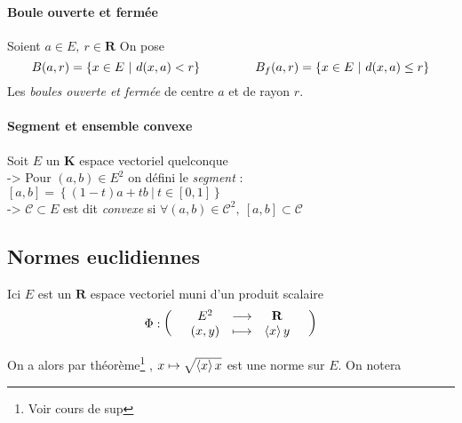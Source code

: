 			
		\traitd
		\paragraph{Boule ouverte et fermée} Soient $a\in E,~r\in\mathbf{R}$ On pose
			\[B(a,r) = \left\{ x\in E ~|~ d(x,a)<r\right\} \hspace*{1.5cm} B_f (a,r) = \left\{ x\in E ~|~ d(x,a) \leq r\right\}\]
			\hspace*{0.6cm} Les \emph{boules ouverte et fermée} de centre $a$ et de rayon $r$. 
		\traitdouble
		\paragraph{Segment et ensemble convexe} Soit $E$ un $\mathbf{K}$ espace vectoriel quelconque \vspace*{0.2cm}\\
			\hspace*{0.5cm} -> Pour $(a,b)\in E^2$ on défini le \emph{segment} : $[a,b]=\left\{ (1-t)a +tb ~\vert ~t\in [0,1]\right\}$ \\
			\hspace*{0.5cm} -> $\mathcal{C} \subset E$ est dit \emph{convexe} si $\forall (a,b)\in \mathcal{C}^2,~[a,b]\subset \mathcal{C}$
		\trait 
		
		 \medskip
		

	\subsection{Normes euclidiennes}
		Ici $E$ est un $\mathbf{R}$ espace vectoriel muni d'un produit scalaire\footnotemark[1] 
		\[
			\Phi :  \appli{E^2}{(x,y)}{\mathbf{R}}{\scal{x}{y}}
		\]
			
		
		On a alors par théorème\footnote[2]{Voir cours de sup} ,  $x\mapsto \sqrt{\scal{x}{x}}$ est une norme sur $E$.  
		On notera \begin{center}  \end{center} 
		
		 \medskip
			

